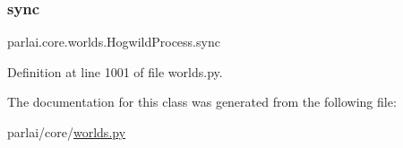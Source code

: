 \subsubsection{\texorpdfstring{sync}{sync}}
{\footnotesize\ttfamily parlai.\+core.\+worlds.\+Hogwild\+Process.\+sync}



Definition at line 1001 of file worlds.\+py.



The documentation for this class was generated from the following file\+:\begin{DoxyCompactItemize}
\item 
parlai/core/\hyperlink{parlai_2core_2worlds_8py}{worlds.\+py}\end{DoxyCompactItemize}
